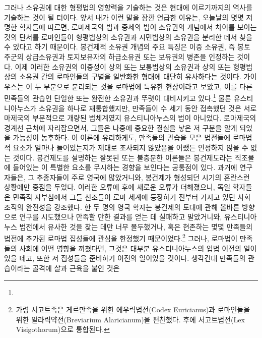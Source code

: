그러나 소유권에 대한 형평법의 영향력을 기술하는 것은
현대에 이르기까지의 역사를 기술하는 것이 될 터이다.
앞서 내가 이런 말을 잠깐 언급한 이유는,
오늘날의 몇몇 저명한 학자들에 따르면,
로마제국의 법과 중세의 법이 소유권의 개념에서 차이를 보이는 것의 단서를
로마인들이 형평법상의 소유권과 시민법상의 소유권을 분리한 데서
찾을 수 있다고 하기 때문이다.
봉건제적 소유권 개념의 주요 특징은
이중 소유권,
즉 봉토 주군의 상급소유권과
토지보유자의 하급소유권 또는 보유권의
병존을 인정하는 것이다.
이제 이러한 소유권의 이중성이
상의 또는 보통법상의 소유권과
상의 또는 형평법상의 소유권 간의
로마인들의
구별을
일반화한 형태에 대단히 유사하다는 것이다.
가이우스는
이 두 부분으로 분리되는 것을
로마법에 특유한 현상이라고 보았고,
이를 다른 민족들의 관습인
단일한 또는 완전한 소유권과 뚜렷이
대비시키고 있다.\footnote{%
   }
물론
유스티니아누스가 소유권을
하나로 재통합했지만,
만족들이 수 세기 동안 접촉했던 것은
서로마제국의 부분적으로 개량된 법체계였지
유스티니아누스의 법이 아니었다.
로마제국의 경계선 근처에 자리잡으면서,
그들은
나중에 중요한 결실을 낳은
저 구분을 알게 되었을 가능성이 농후하다.
이 이론에 유리하게도,
만족들의 관습을 모은 법전들에
로마법적 요소가 얼마나 들어있는지가
제대로 조사되지 않았음을
어쨌든 인정하지 않을 수 없는 것이다.
봉건제도를 설명하는 잘못된 또는 불충분한 이론들은
봉건제도라는 직조물에 들어있는
이 특별한 요소를 무시하는 경향을 보인다는 공통점이 있다.
과거에 연구자들은,
그 추종자들이 주로 영국에 많았거니와,
봉건제가 형성되던 시기의 혼란스런 상황에만 중점을 두었다.
이러한 오류에 후에 새로운 오류가 더해졌으니,
독일 학자들은
민족적 자부심에서
그들 선조들이 로마 세계에 등장하기 전부터
가지고 있던 사회 조직의 완전성을 강조했다.
한 두 명의 영국 학자는
봉건제의 토대에 관해
올바른 방향으로 연구를
시도했으나
만족할 만한 결과를 얻는 데 실패하고 말았거니와,
유스티니아누스 법전에서 유사한 것을 찾는 데만 너무 몰두했거나,
혹은 현존하는 몇몇 만족들의 법전에 추가된
로마법 집성들에 관심을 한정했기 때문이었다.\footnote{%
  가령 서고트족은 게르만족을 위한 에우릭법전(Codex Euricianus)과
  로마인들을 위한 알라릭약전(Breviarium Alaricianum)을 편찬했다. 후에
  서고트법전(Lex Visigothorum)으로 통합된다. }
그러나,
로마법이 만족들의 사회에 어떤 영향을 끼쳤다면,
그것은
대부분
유스티니아누스의 입법 이전의 일이었을 테고,
또한 저 집성들을 준비하기 이전의 일이었을 것이다.
생각건대
만족들의 관습이라는 골격에 살과 근육을 붙인 것은
